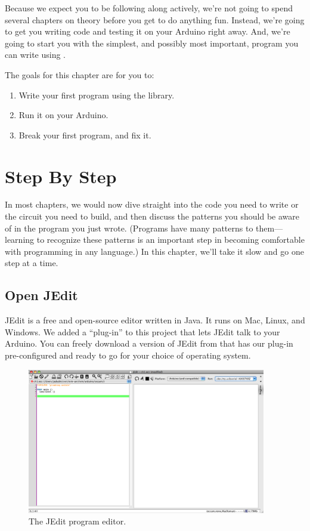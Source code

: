 
Because we expect you to be following along actively, we're not going to spend several chapters on theory before you get to do anything fun. Instead, we're going to get you writing code and testing it on your Arduino right away. And, we're going to start you with the simplest, and possibly most important, program you can write using \plumbing.

\GOALS
The goals for this chapter are for you to:

\begin{enumerate}
	\item Write your first program using the \plumbing library.
	\item Run it on your Arduino.
	\item Break your first program, and fix it.
\end{enumerate}


\section{Step By Step}
In most chapters, we would now dive straight into the code you need to write or the circuit you need to build, and then discuss the patterns you should be aware of in the program you just wrote. (Programs have many patterns to them---learning to recognize these patterns is an important step in becoming comfortable with programming in any language.) In this chapter, we'll take it slow and go one step at a time.
          
\subsection{Open JEdit}
JEdit is a free and open-source editor written in Java. It runs on Mac, Linux, and Windows. We added a ``plug-in'' to this project that lets JEdit talk to your Arduino. You can freely download a version of JEdit from \ccc that has our plug-in pre-configured and ready to go for your choice of operating system.
      
\begin{figure}[bph]
  \begin{center}
    \includegraphics[height=2.5in]{screenshots/20100108-jedit-docked-occplug}
    \caption{The JEdit program editor.}
    \label{screenshot:jedit-occplug-docked}
  \end{center}
\end{figure}

